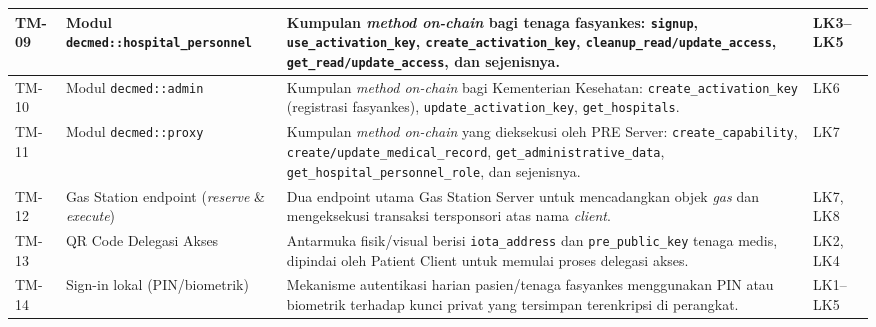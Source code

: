 \begin{xltabular}{\textwidth}{|>{\centering\arraybackslash}p{1.4cm}|>{\raggedright\arraybackslash}p{4.2cm}|X|>{\centering\arraybackslash}p{2cm}|}
    TM-09 & Modul \texttt{decmed::hospital\_personnel} & Kumpulan \textit{method on-chain} bagi tenaga fasyankes: \texttt{signup}, \texttt{use\_activation\_key}, \texttt{create\_activation\_key}, \texttt{cleanup\_read/update\_access}, \texttt{get\_read/update\_access}, dan sejenisnya. & LK3--LK5 \\
    \hline

    TM-10 & Modul \texttt{decmed::admin} & Kumpulan \textit{method on-chain} bagi Kementerian Kesehatan: \texttt{create\_activation\_key} (registrasi fasyankes), \texttt{update\_activation\_key}, \texttt{get\_hospitals}. & LK6 \\
    \hline

    TM-11 & Modul \texttt{decmed::proxy} & Kumpulan \textit{method on-chain} yang dieksekusi oleh PRE Server: \texttt{create\_capability}, \texttt{create/update\_medical\_record}, \texttt{get\_administrative\_data}, \texttt{get\_hospital\_personnel\_role}, dan sejenisnya. & LK7 \\
    \hline

    TM-12 & Gas Station endpoint (\textit{reserve} \& \textit{execute}) & Dua endpoint utama Gas Station Server untuk mencadangkan objek \textit{gas} dan mengeksekusi transaksi tersponsori atas nama \textit{client}. & LK7, LK8 \\
    \hline

    TM-13 & QR Code Delegasi Akses & Antarmuka fisik/visual berisi \texttt{iota\_address} dan \texttt{pre\_public\_key} tenaga medis, dipindai oleh Patient Client untuk memulai proses delegasi akses. & LK2, LK4 \\
    \hline

    TM-14 & Sign-in lokal (PIN/biometrik) & Mekanisme autentikasi harian pasien/tenaga fasyankes menggunakan PIN atau biometrik terhadap kunci privat yang tersimpan terenkripsi di perangkat. & LK1--LK5 \\
    \hline

\end{xltabular}

